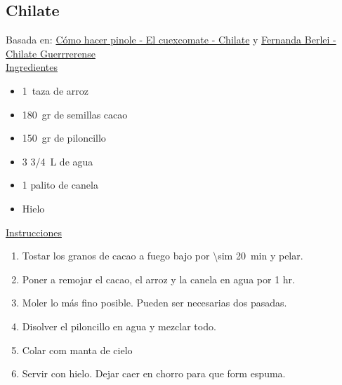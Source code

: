 \subsection{Chilate}

Basada en: \href{
http://www.cuexcomate.com/2016/03/chilate.html}{Cómo hacer pinole - El cuexcomate - Chilate} y \href{https://www.youtube.com/watch?v=xtbajMXlYno}{Fernanda Berlei - Chilate Guerrrerense} \\

\underline{Ingredientes}

\begin{itemize}
\item \SI{1}{taza} de arroz
\item \SI{180}{gr} de semillas cacao
\item \SI{150}{gr} de piloncillo
\item 3 \SI{3/4}{L} de agua
\item 1 palito de canela
\item Hielo
\end{itemize}


\underline{Instrucciones}

\begin{enumerate}
\item Tostar los granos de cacao a fuego bajo por \SI{\sim 20}{min} y pelar.
\item Poner a remojar el cacao, el arroz y la canela en agua por 1 hr.
\item Moler lo más fino posible. Pueden ser necesarias dos pasadas.
\item Disolver el piloncillo en agua y mezclar todo.
\item Colar com manta de cielo
\item Servir con hielo. Dejar caer en chorro para que form espuma.
\end{enumerate}
